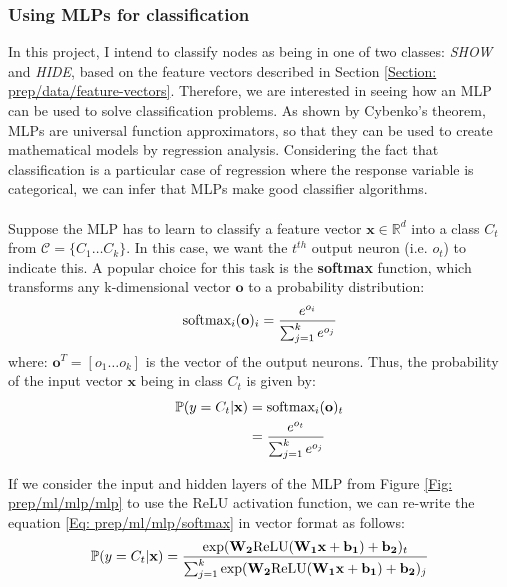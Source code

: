 	\subsubsection*{Using MLPs for classification}
	In this project, I intend to classify nodes as being in one of two classes: \textit{SHOW} and \textit{HIDE}, based on the feature vectors described in Section \ref{Section: prep/data/feature-vectors}. Therefore, we are interested in seeing how an MLP can be used to solve classification problems. As shown by Cybenko's theorem\cite{sigmoidal}, MLPs are universal function approximators, so that they can be used to create mathematical models by regression analysis. Considering the fact that classification is a particular case of regression where the response variable is categorical, we can infer that MLPs make good classifier algorithms. 
	\\ \\
	Suppose the MLP has to learn to classify a feature vector $\mathbf{x} \in \mathbb{R}^d$ into a class $C_t$ from $\mathcal{C} = \{C_1\dots C_k\}$. In this case, we want the $t^{th}$ output neuron (i.e. $o_t$) to indicate this. A popular choice for this task is the \textbf{softmax} function, which transforms any k-dimensional vector $\mathbf{o}$ to a probability distribution:
	\begin{equation}
		\centering
		\text{softmax}_i(\mathbf{o})_i = \frac{e^{o_i}}{\sum_{j=1}^{k}e^{o_j}}
	\end{equation}
	where: $\mathbf{o}^T = [o_1\dots o_k]$ is the vector of the output neurons. Thus, the probability of the input vector $\mathbf{x}$ being in class $C_t$ is given by:
	\begin{equation}
		\centering
		\begin{split}
			\mathbb{P}(y = C_t | \mathbf{x}) & = \text{softmax}_i(\mathbf{o})_t \\
			& = \frac{e^{o_t}}{\sum_{j=1}^{k}e^{o_j}}
		\end{split}
		\label{Eq: prep/ml/mlp/softmax}
	\end{equation} 
	
	If we consider the input and hidden layers of the MLP from Figure \ref{Fig: prep/ml/mlp/mlp} to use the ReLU activation function, we can re-write the equation \ref{Eq: prep/ml/mlp/softmax} in vector format as follows: 
	\begin{equation}
		\centering
		\mathbb{P}(y=C_t | \mathbf{x}) = \frac
		{
			\exp (\mathbf{W_2}\text{ReLU}(\mathbf{W_1 x} + \mathbf{b_1}) + \mathbf{b_2})_t
		}
		{
			{\sum_{j=1}^{k}\exp (\mathbf{W_2}\text{ReLU}(\mathbf{W_1 x} + \mathbf{b_1}) + \mathbf{b_2})_j}
		} 
	\end{equation}
	
